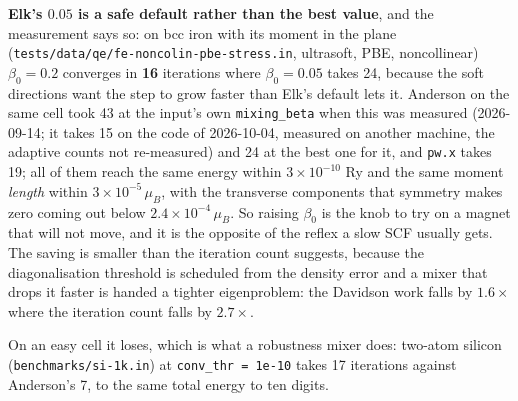 \documentclass[11pt,a4paper]{article}
\newcommand{\code}[1]{\texttt{\small #1}}
\begin{document}
\textbf{Elk's $0.05$ is a safe default rather than the best value}, and the
measurement says so: on bcc iron with its moment in the plane
(\code{tests/data/qe/fe-noncolin-pbe-stress.in}, ultrasoft, PBE, noncollinear)
$\beta_0 = 0.2$ converges in \textbf{16} iterations where $\beta_0 = 0.05$ takes
24, because the soft directions want the step to grow faster than Elk's default
lets it. Anderson on the same cell took 43 at the input's own
\code{mixing\_beta} when this was measured (2026-09-14; it takes 15 on the code of
2026-10-04, measured on another machine, the adaptive counts not re-measured) and 24 at
the best one for it, and \code{pw.x} takes 19; all
of them reach the same energy within $3\times10^{-10}$ Ry and the same moment
\emph{length} within $3\times10^{-5}\,\mu_B$, with the transverse components
that symmetry makes zero coming out below $2.4\times10^{-4}\,\mu_B$. So raising $\beta_0$ is the knob to try on a
magnet that will not move, and it is the opposite of the reflex a slow SCF
usually gets. The saving is smaller than the iteration count suggests, because
the diagonalisation threshold is scheduled from the density error and a mixer
that drops it faster is handed a tighter eigenproblem: the Davidson work falls
by $1.6\times$ where the iteration count falls by $2.7\times$.

On an easy cell it loses, which is what a robustness mixer does: two-atom
silicon (\code{benchmarks/si-1k.in}) at \code{conv\_thr = 1e-10} takes 17
iterations against Anderson's 7, to the same total energy to ten digits.
\end{document}

